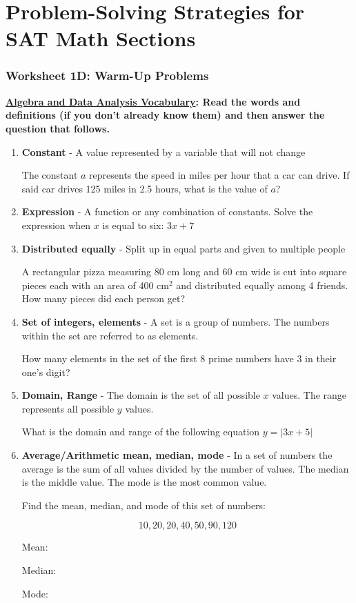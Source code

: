 \chapter[Problem-Solving Strategies]{Problem-Solving Strategies for SAT Math Sections}

\subsection{Worksheet 1D: Warm-Up Problems}

\bigskip
\textbf{\underline{Algebra and Data Analysis Vocabulary}: Read the words and definitions (if you don't already know them) and then answer the question that follows.}

\begin{enumerate}[label=\bfseries\arabic*.]
\item \textbf{Constant} - A value represented by a variable that will not change

\bigskip
The constant $a$ represents the speed in miles per hour that a car can drive. If said car drives 125 miles in 2.5 hours, what is the value of $a$?

\vfill
\item \textbf{Expression} - A function or any combination of constants. Solve the expression when $x$ is equal to six: $3x+7$

\vfill
\item \textbf{Distributed equally} - Split up in equal parts and given to multiple people

\bigskip
A rectangular pizza measuring 80 cm long and 60 cm wide is cut into square pieces each with an area of 400 cm$^2$ and distributed equally among 4 friends. How many pieces did each person get?

\vfill
\item \textbf{Set of integers, elements} - A set is a group of numbers. The numbers within the set are referred to as elements.

\bigskip
How many elements in the set of the first 8 prime numbers have 3 in their one's digit?

\vfill
\item \textbf{Domain, Range} - The domain is the set of all possible $x$ values. The range represents all possible $y$ values.

\bigskip
What is the domain and range of the following equation $y=|3x+5|$

\vfill
\item \textbf{Average/Arithmetic mean, median, mode} - In a set of numbers the average is the sum of all values divided by the number of values. The median is the middle value. The mode is the most common value.

\bigskip
Find the mean, median, and mode of this set of numbers:

\[10,20,20,40,50,90,120\]

Mean:

\medskip
Median:

\medskip
Mode:
\end{enumerate}

